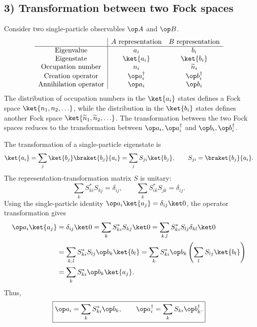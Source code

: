 \subsection*{3) Transformation between two Fock spaces}
Consider two single-particle observables $\op A$ and $\op B$.
\[\begin{array}{c|cc}
&\text{$A$ representation}&\text{$B$ representation}\\\hline
\text{Eigenvalue}&a_i&b_i\\
\text{Eigenstate}&\ket{a_i}&\ket{b_i}\\
\text{Occupation number}&n_i&\widetilde n_i\\
\text{Creation operator}&\op a_i^\dagger&\op b_i^\dagger\\
\text{Annihilation operator}&\op a_i&\op b_i
\end{array}\]
The distribution of occupation numbers in the $\ket{a_i}$ states defines a Fock space $\ket{n_1,n_2,\ldots}$, while the distribution in the $\ket{b_i}$ states defines another Fock space $\ket{\widetilde n_1,\widetilde n_2,\ldots}$. The transformation between the two Fock spaces reduces to the transformation between $\op a_i,\op a_i^\dagger$ and $\op b_i,\op b_i^\dagger$.

The transformation of a single-particle eigenstate is
\[\ket{a_i}=\sum_j\ket{b_j}\braket{b_j}{a_i}
=\sum_jS_{ji}\ket{b_j},\qquad S_{ji}=\braket{b_j}{a_i}.\]
The representation-transformation matrix $S$ is unitary:
\[\sum_k S_{ki}^*S_{kj}=\delta_{ij},\qquad
\sum_k S_{ik}^*S_{jk}=\delta_{ij}.\]
Using the single-particle identity $\op a_i\ket{a_j}=\delta_{ij}\ket0$, the operator transformation gives
\begin{align*}
\op a_i\ket{a_j}
&=\delta_{ij}\ket0
=\sum_k S_{ki}^*S_{kj}\ket0
=\sum_{k,l}S_{ki}^*S_{lj}\delta_{kl}\ket0\\
&=\sum_{k,l}S_{ki}^*S_{lj}\op b_k\ket{b_l}
=\sum_kS_{ki}^*\op b_k\left(\sum_lS_{lj}\ket{b_l}\right)\\
&=\sum_kS_{ki}^*\op b_k\ket{a_j}.
\end{align*}
Thus,
\[\boxed{\op a_i=\sum_kS_{ki}^*\op b_k,\qquad
\op a_i^\dagger=\sum_kS_{ki}\op b_k^\dagger.}\]